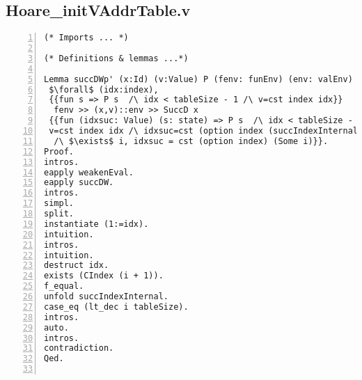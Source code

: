 \begin{appendices}
\chapter{Hoare\_initVAddrTable.v} \label{initFile}
\begin{lstlisting}[xleftmargin=-.1\textwidth,
xrightmargin=-.1\textwidth,
mathescape=true,numbers=left]
(* Imports ... *)

(* Definitions & lemmas ...*)

Lemma succDWp' (x:Id) (v:Value) P (fenv: funEnv) (env: valEnv) :
 $\forall$ (idx:index), 
 {{fun s => P s  /\ idx < tableSize - 1 /\ v=cst index idx}} 
  fenv >> (x,v)::env >> SuccD x 
 {{fun (idxsuc: Value) (s: state) => P s  /\ idx < tableSize - 1 /\ 
 v=cst index idx /\ idxsuc=cst (option index (succIndexInternal idx) 
  /\ $\exists$ i, idxsuc = cst (option index) (Some i)}}.
Proof.
intros.
eapply weakenEval.
eapply succDW.
intros. 
simpl. 
split.
instantiate (1:=idx).  
intuition.
intros.
intuition.
destruct idx.
exists (CIndex (i + 1)).
f_equal.
unfold succIndexInternal.
case_eq (lt_dec i tableSize).
intros.
auto.
intros.
contradiction.
Qed.


\end{lstlisting}
\end{appendices}
